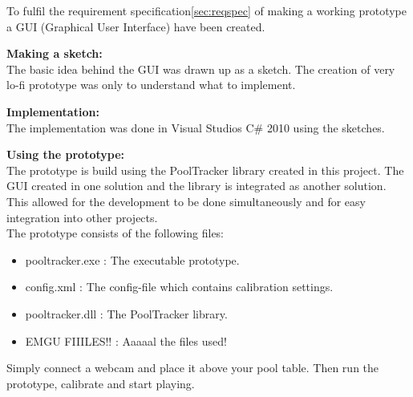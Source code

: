 To fulfil the requirement specification\ref{sec:reqspec} of making a working prototype a GUI (Graphical User Interface) have been created. 

\textbf{Making a sketch:}\\
The basic idea behind the GUI was drawn up as a sketch. The creation of very lo-fi prototype was only to understand what to implement.


\textbf{Implementation:}\\
The implementation was done in Visual Studios C\# 2010 using the sketches. 


\textbf{Using the prototype:}\\
The prototype is build using the PoolTracker library created in this project. The GUI created in one solution and the library is integrated as another solution. This allowed for the development to be done simultaneously and for easy integration into other projects.\\
The prototype consists of the following files:
\begin{itemize}
	\item pooltracker.exe : The executable prototype.
	\item config.xml	  : The config-file which contains calibration settings.
	\item pooltracker.dll : The PoolTracker library.
	\item EMGU FIIILES!!  : Aaaaal the files used!
\end{itemize}

Simply connect a webcam and place it above your pool table. Then run the prototype, calibrate and start playing.